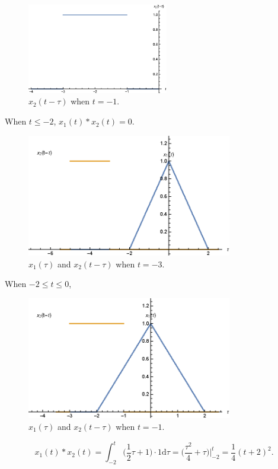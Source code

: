 \documentclass[a4paper]{article}
\begin{document}
\begin{figure}[H]
    \begin{center}
        \includegraphics[width=0.55\textwidth]{12-3.eps}
    \end{center}
    \caption{$x_2(t-\tau)$ when $t=-1$.}
\end{figure}

When $t\leq-2$, $x_1(t)*x_2(t)=0$.
\begin{figure}[H]
    \begin{center}
        \includegraphics[width=0.8\textwidth]{12-4.eps}
    \end{center}
    \caption{$x_1(\tau)$ and $x_2(t-\tau)$ when $t=-3$.}
\end{figure}
\newpage
When $-2\leq t\leq0$,
\begin{figure}[H]
    \begin{center}
        \includegraphics[width=0.8\textwidth]{12-5.eps}
    \end{center}
    \caption{$x_1(\tau)$ and $x_2(t-\tau)$ when $t=-1$.}
\end{figure}
$$x_1(t)*x_2(t)=\int_{-2}^t\bigg(\frac{1}{2}\tau+1\bigg)\cdot1\mathrm{d}\tau=\bigg(\frac{\tau^2}{4}+\tau\bigg)\bigg|_{-2}^t=\frac{1}{4}(t+2)^2.$$
\end{document}
